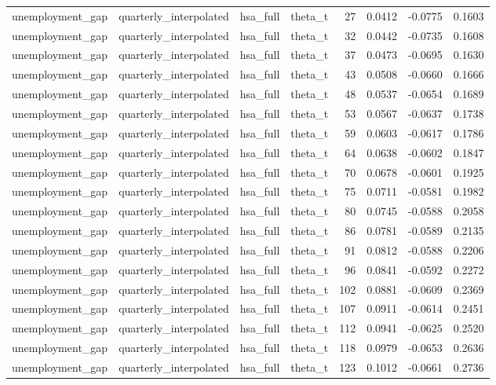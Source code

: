 \begin{tabular}{llllrrrr}
unemployment\_gap & quarterly\_interpolated & hsa\_full & theta\_t & 27 & 0.0412 & -0.0775 & 0.1603 \\
unemployment\_gap & quarterly\_interpolated & hsa\_full & theta\_t & 32 & 0.0442 & -0.0735 & 0.1608 \\
unemployment\_gap & quarterly\_interpolated & hsa\_full & theta\_t & 37 & 0.0473 & -0.0695 & 0.1630 \\
unemployment\_gap & quarterly\_interpolated & hsa\_full & theta\_t & 43 & 0.0508 & -0.0660 & 0.1666 \\
unemployment\_gap & quarterly\_interpolated & hsa\_full & theta\_t & 48 & 0.0537 & -0.0654 & 0.1689 \\
unemployment\_gap & quarterly\_interpolated & hsa\_full & theta\_t & 53 & 0.0567 & -0.0637 & 0.1738 \\
unemployment\_gap & quarterly\_interpolated & hsa\_full & theta\_t & 59 & 0.0603 & -0.0617 & 0.1786 \\
unemployment\_gap & quarterly\_interpolated & hsa\_full & theta\_t & 64 & 0.0638 & -0.0602 & 0.1847 \\
unemployment\_gap & quarterly\_interpolated & hsa\_full & theta\_t & 70 & 0.0678 & -0.0601 & 0.1925 \\
unemployment\_gap & quarterly\_interpolated & hsa\_full & theta\_t & 75 & 0.0711 & -0.0581 & 0.1982 \\
unemployment\_gap & quarterly\_interpolated & hsa\_full & theta\_t & 80 & 0.0745 & -0.0588 & 0.2058 \\
unemployment\_gap & quarterly\_interpolated & hsa\_full & theta\_t & 86 & 0.0781 & -0.0589 & 0.2135 \\
unemployment\_gap & quarterly\_interpolated & hsa\_full & theta\_t & 91 & 0.0812 & -0.0588 & 0.2206 \\
unemployment\_gap & quarterly\_interpolated & hsa\_full & theta\_t & 96 & 0.0841 & -0.0592 & 0.2272 \\
unemployment\_gap & quarterly\_interpolated & hsa\_full & theta\_t & 102 & 0.0881 & -0.0609 & 0.2369 \\
unemployment\_gap & quarterly\_interpolated & hsa\_full & theta\_t & 107 & 0.0911 & -0.0614 & 0.2451 \\
unemployment\_gap & quarterly\_interpolated & hsa\_full & theta\_t & 112 & 0.0941 & -0.0625 & 0.2520 \\
unemployment\_gap & quarterly\_interpolated & hsa\_full & theta\_t & 118 & 0.0979 & -0.0653 & 0.2636 \\
unemployment\_gap & quarterly\_interpolated & hsa\_full & theta\_t & 123 & 0.1012 & -0.0661 & 0.2736 \\

\end{tabular}
